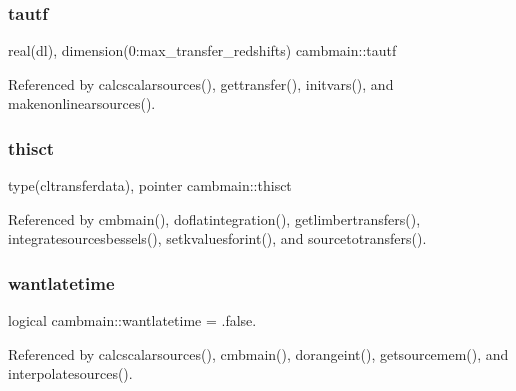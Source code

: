 \mbox{\label{namespacecambmain_a24c75595b15c8996bc6bc65a8bcf3cad}} 
\subsubsection{\texorpdfstring{tautf}{tautf}}
{\footnotesize\ttfamily real(dl), dimension(0\+:max\+\_\+transfer\+\_\+redshifts) cambmain\+::tautf\hspace{0.3cm}{\ttfamily [private]}}



Referenced by calcscalarsources(), gettransfer(), initvars(), and makenonlinearsources().

\mbox{\label{namespacecambmain_a48fb88bbacefa24534f688f9de4ff827}} 
\subsubsection{\texorpdfstring{thisct}{thisct}}
{\footnotesize\ttfamily type(cltransferdata), pointer cambmain\+::thisct\hspace{0.3cm}{\ttfamily [private]}}



Referenced by cmbmain(), doflatintegration(), getlimbertransfers(), integratesourcesbessels(), setkvaluesforint(), and sourcetotransfers().

\mbox{\label{namespacecambmain_a2ce96c9fd586b264b5601a12a8903a31}} 
\subsubsection{\texorpdfstring{wantlatetime}{wantlatetime}}
{\footnotesize\ttfamily logical cambmain\+::wantlatetime = .false.\hspace{0.3cm}{\ttfamily [private]}}



Referenced by calcscalarsources(), cmbmain(), dorangeint(), getsourcemem(), and interpolatesources().

